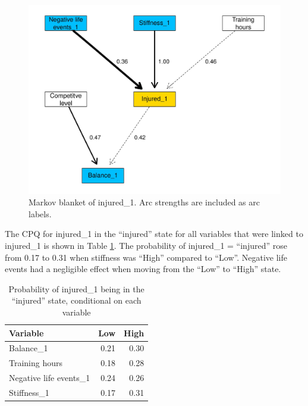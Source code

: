 \documentclass[
  english,
  man]{apa6}
\begin{document}
\begin{figure}

{\centering \includegraphics[width=1\linewidth]{figures_doc/Fig2} 

}

\caption{Markov blanket of injured\_1. Arc strengths are included as arc labels.}\label{fig:fig2}
\end{figure}

The CPQ for injured\_1 in the ``injured'' state for all variables that were linked to injured\_1 is shown in Table \ref{tab:table4}.
The probability of injured\_1 = ``injured'' rose from 0.17 to 0.31 when stiffness was ``High'' compared to ``Low''.
Negative life events had a negligible effect when moving from the ``Low'' to ``High'' state.

\begin{table}[H]

\caption{\label{tab:table4}Probability of injured\_1 being in the ``injured'' state, conditional on each variable}
\centering
\begin{tabular}[t]{l|r|r}
\hline
\textbf{Variable} & \textbf{Low} & \textbf{High}\\
\hline
Balance\_1 & 0.21 & 0.30\\
\hline
Training hours & 0.18 & 0.28\\
\hline
Negative life events\_1 & 0.24 & 0.26\\
\hline
Stiffness\_1 & 0.17 & 0.31\\
\hline
\end{tabular}
\end{table}
\end{document}
